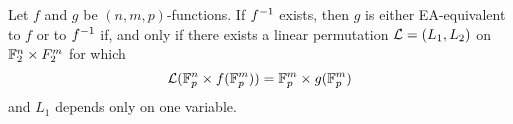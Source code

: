 \begin{proposition}\label{proposition_1.1.6}
  Let $f$ and  $g$ be $(n,m,p)$-functions. If $f^{-1}$ exists, then
  $g$ is either EA-equivalent to $f$ or to $f^{-1}$ if, and only if
  there exists a linear permutation $\mathcal{L}=(L_1,L_2)$ on $\mathbb{F}_2^n \times
  F_2^m$ for which
  \begin{equation*}
    \mathcal{L}(\mathbb{F}_p^n \times f(\mathbb{F}_p^m))=\mathbb{F}_p^m \times g(\mathbb{F}_p^m)
  \end{equation*}
  and $L_1$ depends only on one variable.
\end{proposition}
